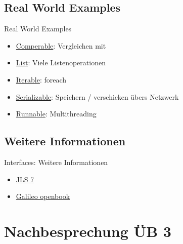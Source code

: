 \documentclass[usepdftitle=false,hyperref={pdfpagelabels=false}]{beamer}
\begin{document}
\subsection{Real World Examples}
\begin{frame}{Real World Examples}
    \begin{itemize}
        \item \href{http://docs.oracle.com/javase/7/docs/api/java/lang/Comparable.html}{Comperable}: Vergleichen mit \myCode{<}
        \item \href{http://docs.oracle.com/javase/7/docs/api/java/util/List.html}{List}: Viele Listenoperationen
        \item \href{http://docs.oracle.com/javase/7/docs/api/java/lang/Iterable.html}{Iterable}: foreach
        \item \href{http://docs.oracle.com/javase/7/docs/api/java/io/Serializable.html}{Serializable}: Speichern / verschicken übers Netzwerk
        \item \href{http://docs.oracle.com/javase/7/docs/api/java/lang/Runnable.html}{Runnable}: Multithreading
    \end{itemize}
\end{frame}

\subsection{Weitere Informationen}
\begin{frame}{Interfaces: Weitere Informationen}
    \begin{itemize}
        \item \href{http://docs.oracle.com/javase/specs/jls/se7/html/jls-9.html}{JLS 7}
        \item \href{http://openbook.galileodesign.de/javainsel5/javainsel06_010.htm}{Galileo openbook}
    \end{itemize}
\end{frame}

\section{Nachbesprechung ÜB 3}
\end{document}
